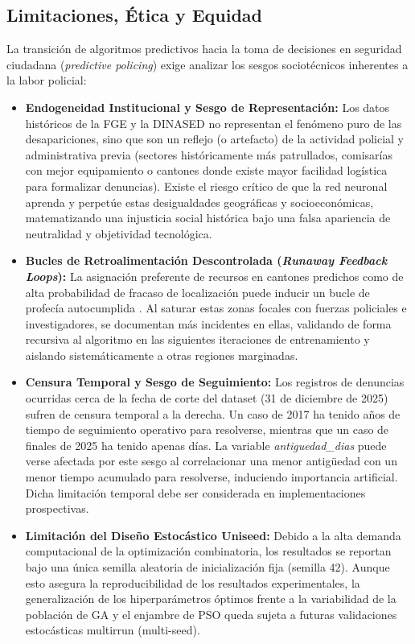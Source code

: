 \documentclass[conference]{IEEEtran}
\begin{document}
\subsection{Limitaciones, Ética y Equidad}
La transición de algoritmos predictivos hacia la toma de decisiones en seguridad ciudadana (\textit{predictive policing}) exige analizar los sesgos sociotécnicos inherentes a la labor policial:
\begin{itemize}
    \item \textbf{Endogeneidad Institucional y Sesgo de Representación:} Los datos históricos de la FGE y la DINASED no representan el fenómeno puro de las desapariciones, sino que son un reflejo (o artefacto) de la actividad policial y administrativa previa (sectores históricamente más patrullados, comisarías con mejor equipamiento o cantones donde existe mayor facilidad logística para formalizar denuncias). Existe el riesgo crítico de que la red neuronal aprenda y perpetúe estas desigualdades geográficas y socioeconómicas, matematizando una injusticia social histórica bajo una falsa apariencia de neutralidad y objetividad tecnológica.
    \item \textbf{Bucles de Retroalimentación Descontrolada (\textit{Runaway Feedback Loops}):} La asignación preferente de recursos en cantones predichos como de alta probabilidad de fracaso de localización puede inducir un bucle de profecía autocumplida \cite{ensign2018runaway,pagan2023feedback}. Al saturar estas zonas focales con fuerzas policiales e investigadores, se documentan más incidentes en ellas, validando de forma recursiva al algoritmo en las siguientes iteraciones de entrenamiento y aislando sistemáticamente a otras regiones marginadas.
    \item \textbf{Censura Temporal y Sesgo de Seguimiento:} Los registros de denuncias ocurridas cerca de la fecha de corte del dataset (31 de diciembre de 2025) sufren de censura temporal a la derecha. Un caso de 2017 ha tenido años de tiempo de seguimiento operativo para resolverse, mientras que un caso de finales de 2025 ha tenido apenas días. La variable \textit{antiguedad\_dias} puede verse afectada por este sesgo al correlacionar una menor antigüedad con un menor tiempo acumulado para resolverse, induciendo importancia artificial. Dicha limitación temporal debe ser considerada en implementaciones prospectivas.
    \item \textbf{Limitación del Diseño Estocástico Uniseed:} Debido a la alta demanda computacional de la optimización combinatoria, los resultados se reportan bajo una única semilla aleatoria de inicialización fija (semilla 42). Aunque esto asegura la reproducibilidad de los resultados experimentales, la generalización de los hiperparámetros óptimos frente a la variabilidad de la población de GA y el enjambre de PSO queda sujeta a futuras validaciones estocásticas multirrun (multi-seed).

\end{itemize}
\end{document}
